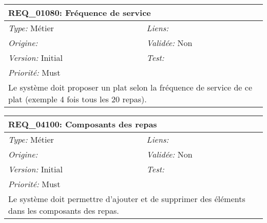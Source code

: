 \begin{table}[!h]

\begin{tabular}{|p{60mm}p{100mm}|}

\hline

\multicolumn{2}{|l|}{\textbf{REQ\_01080:} Fréquence de service} \\ \hline

\emph{Type:} Métier & \emph{Liens:}  \\

\emph{Origine:}  & \emph{Validée:} Non \\

\emph{Version:} Initial & \emph{Test:}  \\

\emph{Priorité:} Must & \\ \hline

\multicolumn{2}{|p{16cm}|}{Le système doit proposer un plat selon la fréquence de service de ce plat (exemple 4 fois tous les 20 repas).} \\ \hline

\end{tabular}

\end{table}



\begin{table}[!h]

\begin{tabular}{|p{60mm}p{100mm}|}

\hline

\multicolumn{2}{|l|}{\textbf{REQ\_04100:} Composants des repas} \\ \hline

\emph{Type:} Métier & \emph{Liens:}  \\

\emph{Origine:}  & \emph{Validée:} Non \\

\emph{Version:} Initial & \emph{Test:}  \\

\emph{Priorité:} Must & \\ \hline

\multicolumn{2}{|p{16cm}|}{Le système doit permettre d'ajouter et de supprimer des éléments dans les composants des repas.} \\ \hline

\end{tabular}

\end{table}



